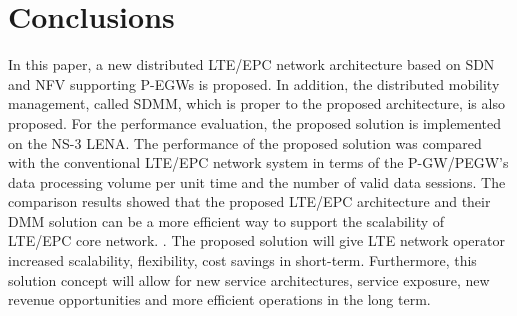 \documentclass[runningheads,a4paper]{llncs}
\begin{document}
\section{Conclusions}


In this paper, a new distributed LTE/EPC network architecture based on SDN and NFV supporting P-EGWs is proposed. In addition, the distributed mobility management, called SDMM, which is proper to the proposed architecture, is also proposed. For the performance evaluation, the proposed solution is implemented on the NS-3 LENA. The performance of the proposed solution was compared with the conventional LTE/EPC network system in terms of the P-GW/PEGW's data processing volume per unit time and the number of valid data sessions. The comparison results showed that the proposed LTE/EPC architecture and their DMM solution can be a more efficient way to support the scalability of LTE/EPC core network.
.
The proposed solution will give LTE network operator increased scalability, flexibility, cost savings in short-term. Furthermore, this solution concept will allow for new service architectures, service exposure, new revenue opportunities and more efficient operations in the long term.

\end{document}
